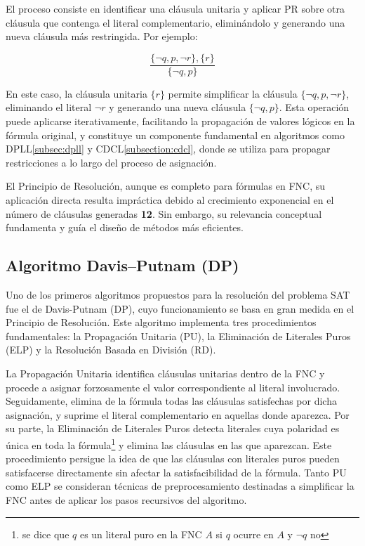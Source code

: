 El proceso consiste en identificar una cl\'ausula unitaria y aplicar PR sobre otra cl\'ausula que contenga el literal complementario, elimin\'andolo y generando una nueva cl\'ausula m\'as restringida. Por ejemplo:

\begin{equation*}
\dfrac{\{\neg q, p, \neg r\},\{r\}}{\{\neg q, p\}}
\end{equation*}

En este caso, la cl\'{a}usula unitaria \( \{r\} \) permite simplificar la cl\'{a}usula \( \{\neg q, p, \neg r\} \), eliminando el literal \( \neg r \) y generando una nueva cl\'{a}usula \( \{\neg q, p\} \). Esta operaci\'{o}n puede aplicarse iterativamente, facilitando la propagaci\'{o}n de valores l\'{o}gicos en la f\'{o}rmula original, y constituye un componente fundamental en algoritmos como DPLL\ref{subsec:dpll} y CDCL\ref{subsection:cdcl}, donde se utiliza para propagar restricciones a lo largo del proceso de asignaci\'{o}n.

El Principio de Resoluci\'on, aunque es completo para fórmulas en FNC, su aplicación directa resulta impráctica debido al crecimiento exponencial en el número de cláusulas generadas \textbf{12}. Sin embargo, su relevancia conceptual fundamenta y guía el diseño de métodos más eficientes.


\subsection{Algoritmo Davis–Putnam (DP)}
\label{subsec:davis-putnam}
Uno de los primeros algoritmos propuestos para la resolución del problema SAT fue el de Davis-Putnam (DP), cuyo funcionamiento se basa en gran medida en el Principio de Resolución. Este algoritmo implementa tres procedimientos fundamentales: la Propagación Unitaria (PU), la Eliminación de Literales Puros (ELP) y la Resolución Basada en División (RD).

La Propagaci\'on Unitaria identifica cláusulas unitarias dentro de la FNC y procede a asignar forzosamente el valor correspondiente al literal involucrado. Seguidamente, elimina de la fórmula todas las cláusulas satisfechas por dicha asignación, y suprime el literal complementario en aquellas donde aparezca. Por su parte, la Eliminaci\'on de Literales Puros detecta literales cuya polaridad es única en toda la fórmula\footnote{se dice que $q$ es un literal puro en la FNC $A$ si $q$ ocurre en $A$ y $\neg q$ no} y elimina las cláusulas en las que aparezcan. Este procedimiento persigue la idea de que las cl\'ausulas con literales puros pueden satisfacerse directamente sin afectar la satisfacibilidad de la fórmula. Tanto PU como ELP se consideran técnicas de preprocesamiento destinadas a simplificar la FNC antes de aplicar los pasos recursivos del algoritmo.


